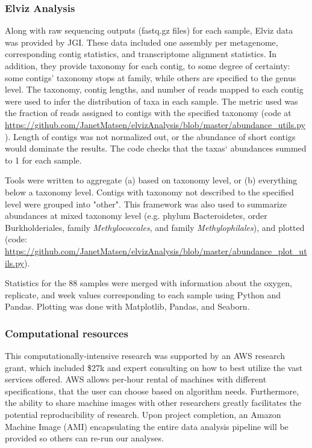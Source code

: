 \subsubsection{Elviz Analysis}
Along with raw sequencing outputs (fastq.gz files) for each sample, Elviz data was provided \cite{cantor2015} by JGI.
These data included one assembly per metagenome, corresponding contig statistics, and transcriptome alignment statistics.
In addition, they provide taxonomy for each contig, to some degree of certainty: some contigs' taxonomy stops at family, while others are specified to the genus level.
The taxonomy, contig lengths, and number of reads mapped to each contig were used to infer the distribution of taxa in each sample.
The metric used was the fraction of reads assigned to contigs with the specified taxonomy (code at \url{https://github.com/JanetMatsen/elvizAnalysis/blob/master/abundance_utils.py}).
Length of contigs was not normalized out, or the abundance of short contigs would dominate the results.
The code checks that the taxas` abundances summed to 1 for each sample.

Tools were written to aggregate (a) based on taxonomy level, or (b) everything below a taxonomy level.
Contigs with taxonomy not described to the specified level were grouped into "other".
This framework was also used to summarize abundances at mixed taxonomy level (e.g. phylum Bacteroidetes, order Burkholderiales, family \textit{Methylococcales}, and family \textit{Methylophilales}), and plotted (code: \url{https://github.com/JanetMatsen/elvizAnalysis/blob/master/abundance_plot_utils.py}).

Statistics for the 88 samples were merged with information about the oxygen, replicate, and week values corresponding to each sample using Python and Pandas.
Plotting was done with Matplotlib, Pandas, and Seaborn.

\subsubsection{Computational resources}
This computationally-intensive research was supported by an AWS research grant, which included \$27k and expert consulting on how to best utilize the vast services offered.
AWS allows per-hour rental of machines with different specifications, that the user can choose based on algorithm needs.
Furthermore, the ability to share machine images with other researchers greatly facilitates the potential reproducibility of research.
Upon project completion, an Amazon Machine Image (AMI) encapsulating the entire data analysis pipeline will be provided so others can re-run our analyses.


